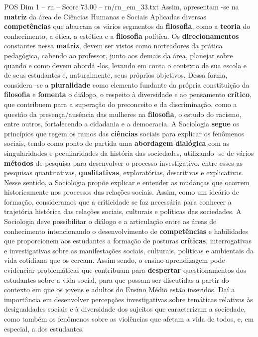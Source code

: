 \begin{textsample}{POS Dim 1 – rn – Score 73.00 – rn/rn\_em\_33.txt}
Assim, apresentam -se na \textbf{matriz} da área de Ciências Humanas e Sociais Aplicadas diversas \textbf{competências} que abarcam os vários segmentos da \textbf{filosofia}, como a \textbf{teoria} do conhecimento, a ética, a estética e a \textbf{filosofia} política.
Os \textbf{direcionamentos} constantes nessa \textbf{matriz}, devem ser vistos como norteadores da prática pedagógica, cabendo ao professor, junto aos demais da área, planejar sobre quando e como devem abordá -los, levando em conta o contexto de sua escola e de seus estudantes e, naturalmente, seus próprios objetivos.
Dessa forma, considera -se a \textbf{pluralidade} como elemento fundante da própria constituição da \textbf{filosofia} e \textbf{fomenta} o diálogo, o respeito à diversidade e ao pensamento \textbf{crítico}, que contribuem para a superação do preconceito e da discriminação, como a questão da presença/ausência das mulheres na \textbf{filosofia}, o estudo do racismo, entre outros, fortalecendo a cidadania e a democracia.
A Sociologia \textbf{segue} os princípios que regem os ramos das \textbf{ciências} sociais para explicar os fenômenos sociais, tendo como ponto de partida uma \textbf{abordagem} \textbf{dialógica} com as singularidades e peculiaridades da história das sociedades, utilizando -se de vários \textbf{métodos} de pesquisa para desenvolver o processo investigativo, entre esses as pesquisas quantitativas, \textbf{qualitativas}, exploratórias, descritivas e explicativas.
Nesse sentido, a Sociologia propõe explicar e entender as mudanças que ocorrem historicamente nos processos das relações sociais.
Assim, como um ideário de formação, consideramos que a criticidade se faz necessária para conhecer a trajetória histórica das relações sociais, culturais e políticas das sociedades.
A Sociologia deve possibilitar o diálogo e a articulação entre as áreas de conhecimento intencionando o desenvolvimento de \textbf{competências} e habilidades que proporcionem aos estudantes a formação de posturas \textbf{críticas}, interrogativas e investigativas sobre as manifestações sociais, culturais, políticas e ambientais da vida cotidiana que os cercam.
Assim sendo, o ensino-aprendizagem pode evidenciar problemáticas que contribuam para \textbf{despertar} questionamentos dos estudantes sobre a vida social, para que possam ser discutidas a partir do contexto em que os jovens e adultos do Ensino Médio estão inseridos.
Daí a importância em desenvolver percepções investigativas sobre temáticas relativas às desigualdades sociais e à diversidade dos sujeitos que caracterizam a sociedade, como também os fenômenos sobre as violências que afetam a vida de todos, e, em especial, a dos estudantes.

\end{textsample}
